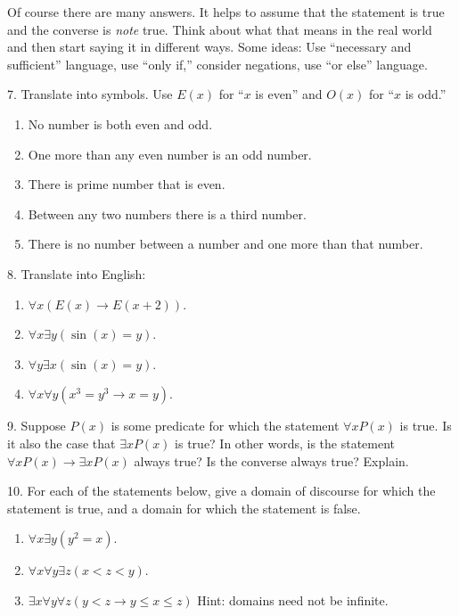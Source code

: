 \documentclass[10pt,]{book}
\theoremstyle{plain}
\theoremstyle{definition}
\numberwithin{equation}{chapter}
\def\imp{\rightarrow}
\newcommand{\lt}{ < }
\begin{document}
\begin{exerciselist}
          Of course there are many answers. It helps to assume that the statement is true and the converse is \emph{note} true. Think about what that means in the real world and then start saying it in different ways. Some ideas: Use ``necessary and sufficient'' language, use ``only if,'' consider negations, use ``or else'' language.
\item[7.]\hypertarget{exercise-7}{}
          Translate into symbols. Use \(E(x)\) for ``\(x\) is even'' and \(O(x)\) for ``\(x\) is odd.''
\leavevmode%
\begin{enumerate}[label=(\alph*)]
\item\hypertarget{li-59}{} No number is both even and odd. %
\item\hypertarget{li-60}{} One more than any even number is an odd number. %
\item\hypertarget{li-61}{} There is prime number that is even. %
\item\hypertarget{li-62}{} Between any two numbers there is a third number. %
\item\hypertarget{li-63}{} There is no number between a number and one more than that number. %
\end{enumerate}
\par\smallskip
\item[8.]\hypertarget{exercise-8}{}
          Translate into English:
\leavevmode%
\begin{enumerate}[label=(\alph*)]
\item\hypertarget{li-69}{}\(\forall x (E(x) \imp E(x +2))\).%
\item\hypertarget{li-70}{}\(\forall x \exists y (\sin(x) = y)\).%
\item\hypertarget{li-71}{}\(\forall y \exists x (\sin(x) = y)\).%
\item\hypertarget{li-72}{}\(\forall x \forall y (x^3 = y^3 \imp x = y)\).%
\end{enumerate}
\par\smallskip
\item[9.]\hypertarget{exercise-9}{}
          Suppose \(P(x)\) is some predicate for which the statement \(\forall x P(x)\) is true. Is it also the case that \(\exists x P(x)\) is true? In other words, is the statement \(\forall x P(x) \imp \exists x P(x)\) always true? Is the converse always true? Explain.
\par\smallskip
\item[10.]\hypertarget{exercise-10}{}
          For each of the statements below, give a domain of discourse for which the statement is true, and a domain for which the statement is false.
\leavevmode%
\begin{enumerate}[label=(\alph*)]
\item\hypertarget{li-77}{}\(\forall x \exists y (y^2 = x)\).%
\item\hypertarget{li-78}{}\(\forall x \forall y \exists z (x \lt  z \lt  y)\).%
\item\hypertarget{li-79}{}\(\exists x \forall y \forall z (y \lt  z \imp y \le x \le z)\) Hint: domains need not be infinite.%
\end{enumerate}
\par\smallskip
\end{exerciselist}
\end{document}
